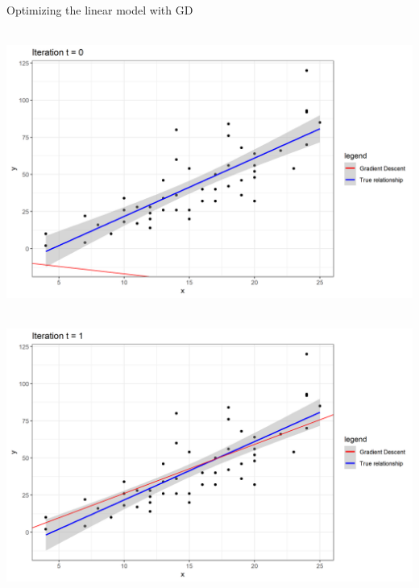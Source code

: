 \begin{vbframe}{Optimizing the linear model with GD}
	\framebreak
	
	
	\begin{center}
	$ $ \\
	\includegraphics[width=\textwidth]{figure_man/iter0.png}\\
	\begin{footnotesize}
	\end{footnotesize}
	\end{center}


	
	\framebreak
	
	\begin{center}
	$ $ \\
	\includegraphics[width=\textwidth]{figure_man/iter1.png}\\
	\begin{footnotesize}
	\end{footnotesize}
	\end{center}
	
	\framebreak
	

\end{vbframe}
